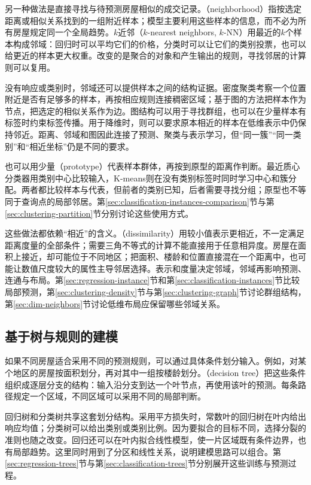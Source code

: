 另一种做法是直接寻找与待预测房屋相似的成交记录。（neighborhood）指按选定距离或相似关系找到的一组附近样本；模型主要利用这些样本的信息，而不必为所有房屋规定同一个全局趋势。$k$近邻（$k$-nearest neighbors, $k$-NN）用最近的$k$个样本构成邻域：回归时可以平均它们的价格，分类时可以让它们的类别投票，也可以给更近的样本更大权重。改变的是聚合的对象和产生输出的规则，寻找邻居的计算则可以复用。

没有响应或类别时，邻域还可以提供样本之间的结构证据。密度聚类考察一个位置附近是否有足够多的样本，再按相应规则连接稠密区域；基于图的方法把样本作为节点，把选定的相似关系作为边。图结构可以用于寻找群组，也可以在少量样本有标签时约束标签传播。用于降维时，则可以要求原本相近的样本在低维表示中仍保持邻近。距离、邻域和图因此连接了预测、聚类与表示学习，但“同一簇”“同一类别”和“相近坐标”仍是不同的要求。

也可以用少量（prototype）代表样本群体，再按到原型的距离作判断。最近质心分类器用类别中心比较输入，K-means则在没有类别标签时同时学习中心和簇分配。两者都比较样本与代表，但前者的类别已知，后者需要寻找分组；原型也不等同于查询点的局部邻居。第\ref{sec:classification-instances-comparison}节与第\ref{sec:clustering-partition}节分别讨论这些使用方式。

这些做法都依赖“相近”的含义。（dissimilarity）用较小值表示更相近，不一定满足距离度量的全部条件；需要三角不等式的计算不能直接用于任意相异度。房屋在面积上接近，却可能位于不同地区；把面积、楼龄和位置直接混在一个距离中，也可能让数值尺度较大的属性主导邻居选择。表示和度量决定邻域，邻域再影响预测、连通与布局。第\ref{sec:regression-instance}节和第\ref{sec:classification-instances}节比较局部预测，第\ref{sec:clustering-density}节与第\ref{sec:clustering-graph}节讨论群组结构，第\ref{sec:dim-neighbors}节讨论低维布局应保留哪些邻域关系。

\subsection{基于树与规则的建模}
\label{sec:classic-overview-tree-rules}

如果不同房屋适合采用不同的预测规则，可以通过具体条件划分输入。例如，对某个地区的房屋按面积划分，再对其中一组按楼龄划分。（decision tree）把这些条件组织成逐层分支的结构：输入沿分支到达一个叶节点，再使用该叶的预测。每条路径规定一个区域，不同区域可以采用不同的局部判断。

回归树和分类树共享这套划分结构。采用平方损失时，常数叶的回归树在叶内给出响应均值；分类树可以给出类别或类别比例。因为要拟合的目标不同，选择分裂的准则也随之改变。回归还可以在叶内拟合线性模型，使一片区域既有条件边界，也有局部趋势。这里同时用到了分区和线性关系，说明建模思路可以组合。第\ref{sec:regression-trees}节与第\ref{sec:classification-trees}节分别展开这些训练与预测过程。

